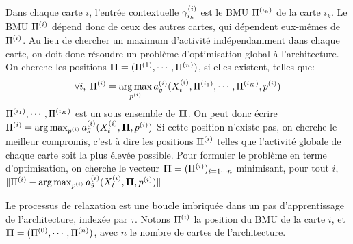 Dans chaque carte $i$, l'entrée contextuelle $\gamma^{({i})}_{i_k}$ est le BMU $\Pi^{({i_k})}$  de la carte $i_k$. Le BMU $\Pi^{({i})}$ dépend donc de ceux des autres cartes, qui dépendent eux-mêmes de $\Pi^{({i})}$. Au lieu de chercher un maximum d'activité indépendamment dans chaque carte, on doit donc résoudre un problème d'optimisation global à  l'architecture. On cherche les positions $\mathbf{\Pi} = (\Pi^{({1})}, \cdots, \Pi^{({n})})$, si elles existent, telles que:
\begin{equation}
\forall i, \; \Pi^{({i})} = \operatorname*{arg\,max}_{p^{({i})}} a_g^{({i})}(X^{({i})}_t, \Pi^{({i_1})}, \cdots, \Pi^{({i_K})},p^{({i})})
\end{equation}
$\Pi^{({i_1})}, \cdots, \Pi^{({i_K})}$ est un sous ensemble de $\mathbf{\Pi}$. On peut donc écrire $\Pi^{({i})} = \operatorname*{arg\,max}_{p^{({i})}} a_g^{({i})}(X^{({i})}_t, \mathbf{\Pi}, p^{({i})})$
Si cette position n'existe pas, on cherche le meilleur compromis, c'est à dire les positions $\Pi^{({i})}$ telles que l'activité globale de chaque carte soit la plus élevée possible.
Pour formuler le problème en terme d'optimisation, on cherche le vecteur $\mathbf{\Pi} = (\Pi^{({i})})_{i=1 \cdots n}$ minimisant, pour tout $i$, $\lVert \Pi^{({i})} - \operatorname*{arg\,max}_{p^{({i})}} a_g^{({i})}(X^{({i})}_t, \mathbf{\Pi}, p^{({i})}) \rVert$


Le processus de relaxation est une boucle imbriquée dans un pas d'apprentissage de l'architecture, indexée par $\tau$. Notons $\Pi^{({i})}$ la position du BMU de la carte $i$, et $\mathbf{\Pi} = (\Pi^{({0})}, \cdots , \Pi^{({n})})$, avec $n$ le nombre de cartes de l'architecture.

